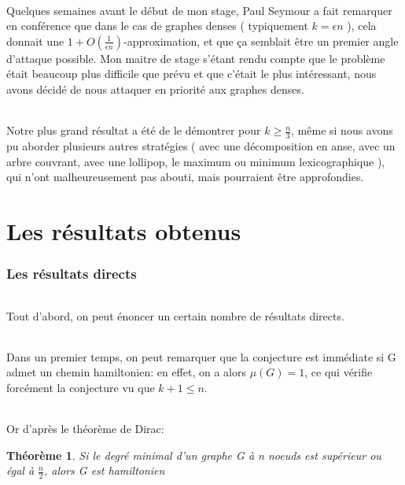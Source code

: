 \documentclass[a4paper]{article}
\newtheorem{theorem}{Théorème}
\theoremstyle{definition}
\theoremstyle{remark}
\begin{document}
\paragraph{}
Quelques semaines avant le début de mon stage, Paul Seymour a fait
remarquer en conférence que dans le cas de graphes denses ( typiquement 
$k = \epsilon n$ ), cela donnait une $1 + O(\frac{1}{\epsilon n})$-approximation, et que ça semblait être un premier angle d'attaque 
possible. Mon maitre de stage s'étant rendu compte que le problème 
était beaucoup plus difficile que prévu et que c'était le plus 
intéressant, nous avons décidé de nous attaquer en priorité aux
graphes denses.

\paragraph{}
Notre plus grand résultat a été de le démontrer pour $k \geq \frac{n}{3}$, même si nous avons pu aborder plusieurs autres stratégies ( avec une
décomposition en anse, avec un arbre couvrant, avec une lollipop, le 
maximum ou minimum lexicographique ), qui n'ont malheureusement pas 
abouti, mais pourraient être approfondies.

\part{Les résultats obtenus}

\section{Les résultats directs}

\paragraph{}
Tout d'abord, on peut énoncer un certain nombre de résultats directs.


\paragraph{}
Dans un premier temps, on peut remarquer que la conjecture est immédiate si G admet un chemin hamiltonien: en effet, on a alors $\mu(G)=1$, ce qui vérifie forcément la conjecture vu que $k+1 \leq n$.


\paragraph{}
Or d'après le théorème de Dirac:
\begin{theorem}
Si le degré minimal d'un graphe G à n noeuds est supérieur ou égal à
$\frac{n}{2}$, alors G est hamiltonien
\end{theorem}
\end{document}

